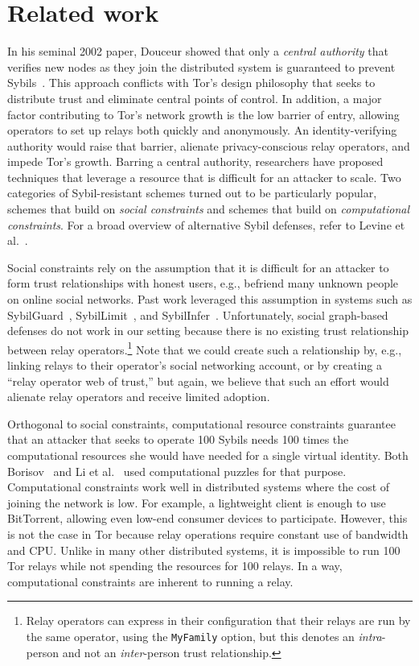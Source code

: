 \section{Related work}
\label{sec:related_work}
In his seminal 2002 paper, Douceur showed that only a \emph{central authority}
that verifies new nodes as they join the distributed system is guaranteed to
prevent Sybils~\cite{Douceur2002a}.  This approach conflicts with Tor's design
philosophy that seeks to distribute trust and eliminate central points of
control.  In addition, a major factor contributing to Tor's network growth is
the low barrier of entry, allowing operators to set up relays both quickly and
anonymously.  An identity-verifying authority would raise that barrier, alienate
privacy-conscious relay operators, and impede Tor's growth.  Barring a central
authority, researchers have proposed techniques that leverage a resource that is
difficult for an attacker to scale.  Two categories of Sybil-resistant schemes
turned out to be particularly popular, schemes that build on \emph{social
constraints} and schemes that build on \emph{computational constraints}.  For a
broad overview of alternative Sybil defenses, refer to Levine et
al.~\cite{Levine2006a}.

Social constraints rely on the assumption that it is difficult for an attacker
to form trust relationships with honest users, e.g., befriend many unknown
people on online social networks.  Past work leveraged this assumption in
systems such as SybilGuard~\cite{Yu2006a}, SybilLimit~\cite{Yu2008a}, and
SybilInfer~\cite{Danezis2009a}.  Unfortunately, social graph-based defenses
do not work in our setting because there is no existing trust relationship
between relay operators.\footnote{Relay operators can express in their
configuration that their relays are run by the same operator, using the
\texttt{MyFamily} option, but this denotes an \emph{intra}-person and not an
\emph{inter}-person trust relationship.} Note that we could create such a
relationship by, e.g., linking relays to their operator's social networking
account, or by creating a ``relay operator web of trust,'' but again, we
believe that such an effort would alienate relay operators and receive limited
adoption.

Orthogonal to social constraints, computational resource constraints guarantee
that an attacker that seeks to operate 100 Sybils needs 100 times the
computational resources she would have needed for a single virtual identity.
Both Borisov~\cite{Borisov2006a} and Li et al.~\cite{Li2012a} used computational
puzzles for that purpose.  Computational constraints work well in distributed
systems where the cost of joining the network is low.  For example, a
lightweight client is enough to use BitTorrent, allowing even low-end consumer
devices to participate.  However, this is not the case in Tor because relay
operations require constant use of bandwidth and CPU.  Unlike in many other
distributed systems, it is impossible to run 100 Tor relays while not spending
the resources for 100 relays.  In a way, computational constraints are inherent
to running a relay.

